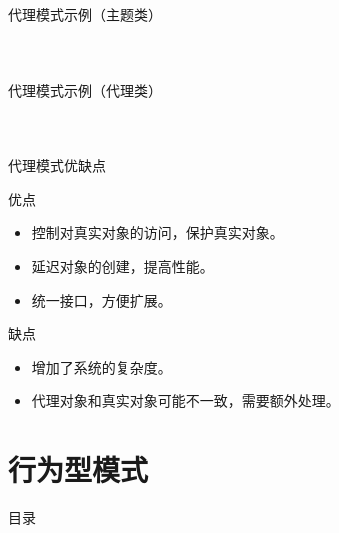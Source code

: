 \documentclass[UTF8,aspectratio=169]{beamer}
\begin{document}
\begin{frame}{代理模式示例（主题类）}
    \begin{columns}
        \begin{column}{0.48\textwidth}
            \inputminted[firstline=1, lastline=14]{cpp}{code/proxy_pattern.cpp}
        \end{column}
        \begin{column}{0.48\textwidth}
            \inputminted[firstline=16, lastline=35]{cpp}{code/proxy_pattern.cpp}
        \end{column}
    \end{columns}
\end{frame}

\begin{frame}{代理模式示例（代理类）}
    \begin{columns}
        \begin{column}{0.48\textwidth}
            \inputminted[firstline=37, lastline=56]{cpp}{code/proxy_pattern.cpp}
        \end{column}
        \begin{column}{0.48\textwidth}
            \inputminted[firstline=64, lastline=82]{cpp}{code/proxy_pattern.cpp}
        \end{column}
    \end{columns}
\end{frame}

\begin{frame}{代理模式优缺点}
    \begin{ytublock}{优点}
        \begin{itemize}
            \item 控制对真实对象的访问，保护真实对象。
            \item 延迟对象的创建，提高性能。
            \item 统一接口，方便扩展。
        \end{itemize}
    \end{ytublock}
    \begin{alertytublock}{缺点}
        \begin{itemize}
            \item 增加了系统的复杂度。
            \item 代理对象和真实对象可能不一致，需要额外处理。
        \end{itemize}
    \end{alertytublock}
\end{frame}

\section{行为型模式}
\begin{frame}{目录}
    \begin{multicols}{2}
    \end{multicols}
\end{frame}
\end{document}
